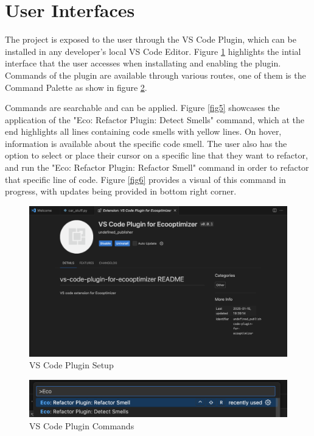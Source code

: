 \documentclass[12pt, titlepage]{article}
\begin{document}

\section{User Interfaces}

The project is exposed to the user through the VS Code Plugin, which can be installed 
in any developer's local VS Code Editor. Figure \ref{fig3} highlights the intial interface that 
the user accesses when installating and enabling the plugin. Commands of the plugin are 
available through various routes, one of them is the Command Palette as show in figure \ref{fig4}.

Commands are searchable and can be applied. Figure \ref{fig5} showcases the application of the 
"Eco: Refactor Plugin: Detect Smells" command, which at the end highlights all lines containing 
code smells with yellow lines. On hover, information is available about the specific code smell.
The user also has the option to select or place their cursor on a specific line that they want 
to refactor, and run the "Eco: Refactor Plugin: Refactor Smell" command in order to refactor that 
specific line of code. Figure \ref{fig6} provides a visual of this command in progress, with updates
being provided in bottom right corner.

\begin{figure}[H]
  \centering
  \includegraphics[width=\textwidth]{../../Images/VSPlugin.png}
  \caption{VS Code Plugin Setup}
  \label{fig3}
  \end{figure}
  
  \begin{figure}[H]
  \centering
  \includegraphics[width=\textwidth]{../../Images/VSPluginCommands.png}
  \caption{VS Code Plugin Commands}
  \label{fig4}
  \end{figure}
  
\end{document}
